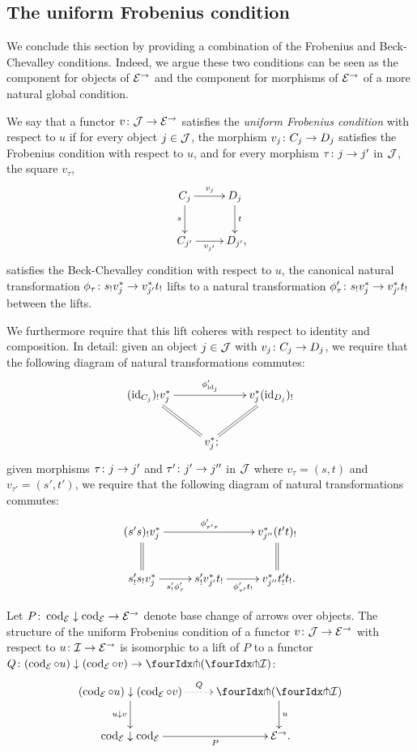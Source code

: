 \documentclass[reqno,10pt,a4paper,oneside,draft]{amsart}
\begin{document}
\subsection*{The uniform Frobenius condition}

We conclude this section by providing a combination of the Frobenius and Beck-Chevalley conditions.
Indeed, we argue these two conditions can be seen as the component for objects of $\catE^\to$ and the component for morphisms of $\catE^\to$ of a more natural global condition.

\begin{definition} \label{def:uniFrobcond}
We say that a functor $v \co \cal{J} \to \catE^\to$ satisfies the \emph{uniform Frobenius condition} with respect to $u$ if for every object $j \in \cal{J}$, the morphism $v_j \co C_j \to D_j$ satisfies the Frobenius condition with respect to $u$, and for every morphism $\tau \co j \to j'$ in $\cal{J}$, the square $v_\tau$,
\[
\xymatrix{
  C_j
  \ar[r]^{v_j}
  \ar[d]_{s}
&
  D_j
  \ar[d]^{t}
\\
  C_{j'}
  \ar[r]_-{v_{j'}}
&
  D_{j'}
\rlap{,}}
\]
satisfies the Beck-Chevalley condition with respect to $u$, \ie the canonical natural transformation $\phi_\tau \co s_! v_j^* \to v_{j'}^* t_!$ lifts to a natural transformation $\phi_\tau' \co s_! v_j^* \to v_{j'}^* t_!$ between the lifts.

We furthermore require that this lift coheres with respect to identity and composition.
In detail: given an object $j \in \cal{J}$ with $v_j \co C_j \to D_j$, we require that the following diagram of natural transformations commutes:
\[
\xymatrix{
  (\id_{C_j})_! v_j^*
  \ar[rr]^{\phi'_{\id_j}}
  \ar@{=}[dr]
&&
  v_j^* (\id_{D_j})_!
  \ar@{=}[dl]
\\&
  v_j^*
\rlap{;}}
\]
given morphisms $\tau \co j \to j'$ and $\tau' \co j' \to j''$ in $\cal{J}$ where $v_\tau = (s, t)$ and $v_{\tau'} = (s', t')$, we require that the following diagram of natural transformations commutes:
\[
\xymatrix{
  (s' s)_! v_j^*
  \ar[rr]^{\phi'_{\tau' \tau}}
  \ar@{=}[d]
&&
  v_{j''}^* (t' t)_!
  \ar@{=}[d]
\\
  s'_! s_! v_j^*
  \ar[r]_{s'_! \phi'_\tau}
&
  s'_! v_{j'}^* t_!
  \ar[r]_{\phi'_{\tau'} t_!}
&
  v_{j''}^* t'_! t_!  
\rlap{.}}
\]
\end{definition}

\begin{proposition}
\label{uniform-frob-nice}
Let $P \co \cod_{\cal{E}} \downarrow \cod_{\cal{E}} \to \cal{E}^\to$ denote base change of arrows over objects.
The structure of the uniform Frobenius condition of a functor $v \co \cal{J} \to \cal{E}^\to$ with respect to $u \co \cal{I} \to \cal{E}^\to$ is isomorphic to a lift of $P$ to a functor $Q \co (\cod_{\cal{E}} \cc u) \downarrow (\cod_{\cal{E}} \cc v) \to \liftl{(\liftr{\cal{I}})}$:
\[
\xymatrix{
  (\cod_{\cal{E}} \cc u) \downarrow (\cod_{\cal{E}} \cc v)
  \ar@{.>}[r]^-{Q}
  \ar[d]_{u \downarrow v}
&
  \liftl{(\liftr{\cal{I}})}
  \ar[d]^{u}
\\
  \cod_{\cal{E}} \downarrow \cod_{\cal{E}}
  \ar[r]_-{P}
&
  \cal{E}^\to
\rlap{.}}
\]
\end{proposition}
\end{document}
